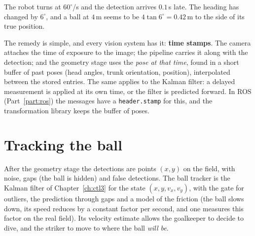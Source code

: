 \begin{example}
The robot turns at $60^{\circ}$/s and the detection arrives $0.1$\,s late. The heading has changed by $6^{\circ}$, and a ball at $4$\,m seems to be $4\tan6^{\circ}=0.42$\,m to the side of its true position.
\end{example}

The remedy is simple, and every vision system has it: \textbf{time stamps}. The camera attaches the time of exposure to the image; the pipeline carries it along with the detection; and the geometry stage uses the \emph{pose at that time}, found in a short buffer of past poses (head angles, trunk orientation, position), interpolated between the stored entries. The same applies to the Kalman filter: a delayed measurement is applied at its own time, or the filter is predicted forward. In ROS (Part~\ref{part:ros}) the messages have a \verb!header.stamp! for this, and the transformation library keeps the buffer of poses.

\section*{Tracking the ball}
After the geometry stage the detections are points $(x,y)$ on the field, with noise, gaps (the ball is hidden) and false detections. The ball tracker is the Kalman filter of Chapter~\ref{ch:ctl3} for the state $(x,y,v_x,v_y)$, with the gate for outliers, the prediction through gaps and a model of the friction (the ball slows down, its speed reduces by a constant factor per second, and one measures this factor on the real field). Its velocity estimate allows the goalkeeper to decide to dive, and the striker to move to where the ball \emph{will be}.


